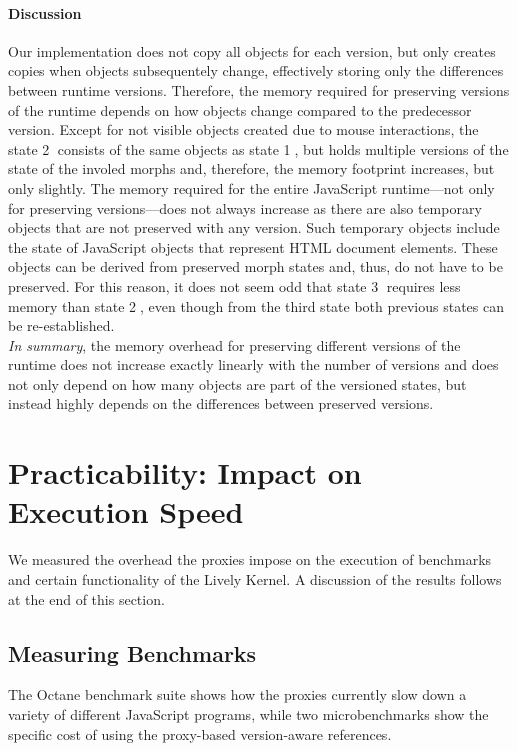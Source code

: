 \paragraph{Discussion}
Our implementation does not copy all objects for each version, but only creates copies when objects subsequentely change, effectively storing only the differences between runtime versions.
Therefore, the memory required for preserving versions of the runtime depends on how objects change compared to the predecessor version.
Except for not visible objects created due to mouse interactions, the state \textcircled{2} consists of the same objects as state \textcircled{1}, but holds multiple versions of the state of the involed morphs and, therefore, the memory footprint increases, but only slightly.
The memory required for the entire JavaScript runtime---not only for preserving versions---does not always increase as there are also temporary objects that are not preserved with any version.
Such temporary objects include the state of JavaScript objects that represent HTML document elements.
These objects can be derived from preserved morph states and, thus, do not have to be preserved.
For this reason, it does not seem odd that state \textcircled{3} requires less memory than state \textcircled{2}, even though from the third state both previous states can be re-established.\\
\emph{In summary}, the memory overhead for preserving different versions of the runtime does not increase exactly linearly with the number of versions and does not only depend on how many objects are part of the versioned states, but instead highly depends on the differences between preserved versions.



\section{Practicability: Impact on Execution Speed} \label{sec:DISCUSSION:3}

We measured the overhead the proxies impose on the execution of benchmarks and certain functionality of the Lively Kernel.
A discussion of the results follows at the end of this section.


\subsection{Measuring Benchmarks}

The Octane benchmark suite shows how the proxies currently slow down a variety of different JavaScript programs, while two microbenchmarks show the specific cost of using the proxy-based version-aware references.


